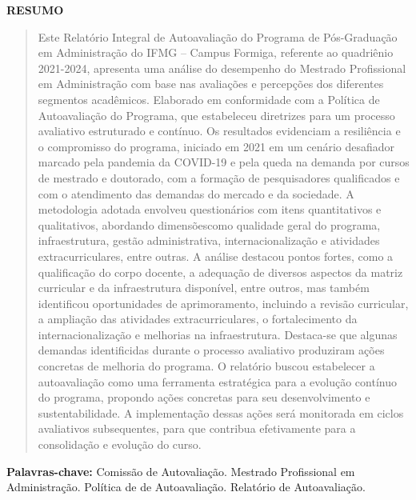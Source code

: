 \newenvironment{meuresumo}{
  \clearpage
  \small
  \vspace{-1cm}
  \begin{center}
    \bfseries RESUMO
    \vspace{0.5em}
  \end{center}
  \begin{quote}
}{
  \end{quote}
  \vspace{-1.1em}
  \begin{center}
  \begin{minipage}{0.87\textwidth} 
  \textbf{Palavras-chave:} Comissão de Autovaliação. 
  Mestrado Profissional em Administração. Política de de Autoavaliação. 
  Relatório de Autoavaliação.
  \end{minipage}
  \end{center}
  \clearpage
}

\begin{meuresumo}
Este Relatório Integral de Autoavaliação do Programa de Pós-Graduação em 
Administração do IFMG – Campus Formiga, referente ao quadriênio 2021-2024, 
apresenta uma análise do desempenho do Mestrado Profissional em Administração 
com base nas avaliações e percepções dos diferentes segmentos acadêmicos. 
Elaborado em conformidade com a Política de Autoavaliação do Programa, 
que estabeleceu diretrizes para um processo avaliativo estruturado e 
contínuo. Os resultados evidenciam a resiliência e o compromisso do 
programa, iniciado em 2021 em um cenário desafiador marcado pela 
pandemia da COVID-19 e pela queda na demanda por cursos de mestrado e 
doutorado, com a formação de pesquisadores qualificados e com o 
atendimento das demandas do mercado e da sociedade. A metodologia adotada 
envolveu questionários com itens quantitativos e qualitativos, abordando 
dimensõescomo qualidade geral do programa, infraestrutura, gestão 
administrativa, internacionalização e atividades extracurriculares, entre 
outras. A análise destacou pontos fortes, como a qualificação do corpo 
docente, a adequação de diversos aspectos da matriz curricular e da 
infraestrutura disponível, entre outros, mas também identificou oportunidades de 
aprimoramento, incluindo a revisão curricular, a ampliação das atividades 
extracurriculares, o fortalecimento da internacionalização e melhorias 
na infraestrutura. Destaca-se que algunas demandas identificidas durante 
o processo avaliativo produziram ações concretas de melhoria do 
programa. O relatório buscou estabelecer a autoavaliação como uma 
ferramenta estratégica para a evolução contínuo do programa, 
propondo ações concretas para seu desenvolvimento e sustentabilidade. 
A implementação dessas ações será monitorada em ciclos avaliativos 
subsequentes, para que contribua efetivamente para a consolidação 
e evolução do curso. 
\end{meuresumo}



\clearpage
{}


